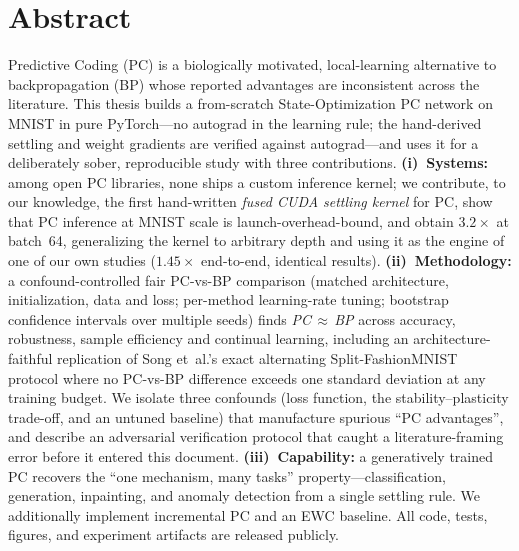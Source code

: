 \chapter*{Abstract}

Predictive Coding (PC) is a biologically motivated, local-learning alternative to
backpropagation (BP) whose reported advantages are inconsistent across the literature. This
thesis builds a from-scratch State-Optimization PC network on MNIST in pure PyTorch---no
autograd in the learning rule; the hand-derived settling and weight gradients are verified
against autograd---and uses it for a deliberately sober, reproducible study with three
contributions. \textbf{(i)~Systems:} among open PC libraries, none ships a custom inference
kernel; we contribute, to our knowledge, the first hand-written \emph{fused CUDA settling
kernel} for PC, show that PC inference at MNIST scale is launch-overhead-bound, and obtain
$3.2\times$ at batch~64, generalizing the kernel to arbitrary depth and using it as the engine
of one of our own studies ($1.45\times$ end-to-end, identical results). \textbf{(ii)~Methodology:}
a confound-controlled fair PC-vs-BP comparison (matched architecture, initialization, data and
loss; per-method learning-rate tuning; bootstrap confidence intervals over multiple seeds) finds
\emph{PC\,$\approx$\,BP} across accuracy, robustness, sample efficiency and continual learning,
including an architecture-faithful replication of Song et~al.'s exact alternating
Split-FashionMNIST protocol where no PC-vs-BP difference exceeds one standard deviation at any
training budget. We isolate three confounds (loss function, the stability--plasticity trade-off,
and an untuned baseline) that manufacture spurious ``PC advantages'', and describe an adversarial
verification protocol that caught a literature-framing error before it entered this document.
\textbf{(iii)~Capability:} a generatively trained PC recovers the ``one mechanism, many tasks''
property---classification, generation, inpainting, and anomaly detection from a single settling
rule. We additionally implement incremental PC and an EWC baseline. All code, tests, figures, and
experiment artifacts are released publicly.


